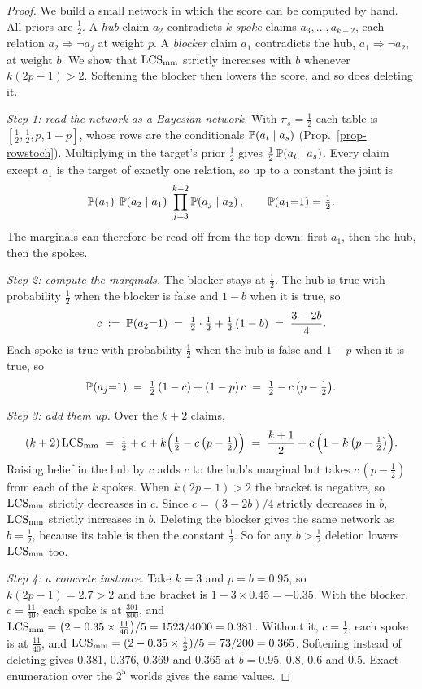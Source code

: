 \begin{proof}
We build a small network in which the score can be computed by hand. All priors are $\tfrac12$. A
\emph{hub} claim $a_2$ contradicts $k$ \emph{spoke} claims $a_3,\dots,a_{k+2}$, each relation
$a_2\Rightarrow\neg a_j$ at weight $p$. A \emph{blocker} claim $a_1$ contradicts the hub,
$a_1\Rightarrow\neg a_2$, at weight $b$. We show that $\mathrm{LCS}_{\mathrm{mm}}$ strictly increases with $b$
whenever $k(2p-1)>2$. Softening the blocker then lowers the score, and so does deleting it.

\emph{Step 1: read the network as a Bayesian network.} With $\pi_s=\tfrac12$ each \con{} table is
$[\tfrac12,\tfrac12,p,1-p]$, whose rows are the conditionals $\mathbb{P}\!\left( a_t\mid a_s \right)$
(Prop.~\ref{prop-rowstoch}). Multiplying in the target's prior $\tfrac12$ gives
$\tfrac12\,\mathbb{P}\!\left( a_t\mid a_s \right)$. Every claim except $a_1$ is the target of exactly one relation, so up
to a constant the joint is
\[
\mathbb{P}\!\left( a_1 \right)\;\mathbb{P}\!\left( a_2\mid a_1 \right)\;\prod_{j=3}^{k+2}\mathbb{P}\!\left( a_j\mid a_2 \right),
\qquad \mathbb{P}\!\left( a_1{=}1 \right)=\tfrac12 .
\]
The marginals can therefore be read off from the top down: first $a_1$, then the hub, then the spokes.

\emph{Step 2: compute the marginals.} The blocker stays at $\tfrac12$. The hub is true with
probability $\tfrac12$ when the blocker is false and $1-b$ when it is true, so
\[
c \;:=\; \mathbb{P}\!\left( a_2{=}1 \right) \;=\; \tfrac12\cdot\tfrac12+\tfrac12\,(1-b) \;=\; \frac{3-2b}{4} .
\]
Each spoke is true with probability $\tfrac12$ when the hub is false and $1-p$ when it is true, so
\[
\mathbb{P}\!\left( a_j{=}1 \right) \;=\; \tfrac12\,(1-c)+(1-p)\,c \;=\; \tfrac12-c\,\bigl(p-\tfrac12\bigr) .
\]

\emph{Step 3: add them up.} Over the $k+2$ claims,
\[
(k+2)\,\mathrm{LCS}_{\mathrm{mm}} \;=\; \tfrac12 + c + k\Bigl(\tfrac12 - c\,\bigl(p-\tfrac12\bigr)\Bigr)
 \;=\; \frac{k+1}{2} + c\,\Bigl(1-k\,\bigl(p-\tfrac12\bigr)\Bigr).
\]
Raising belief in the hub by $c$ adds $c$ to the hub's marginal but takes $c\,(p-\tfrac12)$ from each
of the $k$ spokes. When $k(2p-1)>2$ the bracket is negative, so $\mathrm{LCS}_{\mathrm{mm}}$ strictly decreases in
$c$. Since $c=(3-2b)/4$ strictly decreases in $b$, $\mathrm{LCS}_{\mathrm{mm}}$ strictly increases in $b$. Deleting
the blocker gives the same network as $b=\tfrac12$, because its table is then the constant
$\tfrac12$. So for any $b>\tfrac12$ deletion lowers $\mathrm{LCS}_{\mathrm{mm}}$ too.

\emph{Step 4: a concrete instance.} Take $k=3$ and $p=b=0.95$, so $k(2p-1)=2.7>2$ and the bracket
is $1-3\times0.45=-0.35$. With the blocker, $c=\tfrac{11}{40}$, each spoke is at
$\tfrac{301}{800}$, and $\mathrm{LCS}_{\mathrm{mm}}=\bigl(2-0.35\times\tfrac{11}{40}\bigr)/5=1523/4000=0.381$.
Without it, $c=\tfrac12$, each spoke is at $\tfrac{11}{40}$, and
$\mathrm{LCS}_{\mathrm{mm}}=(2-0.35\times\tfrac12)/5=73/200=0.365$. Softening instead of deleting gives $0.381$,
$0.376$, $0.369$ and $0.365$ at $b=0.95$, $0.8$, $0.6$ and $0.5$. Exact enumeration over the
$2^5$ worlds gives the same values.
\end{proof}

